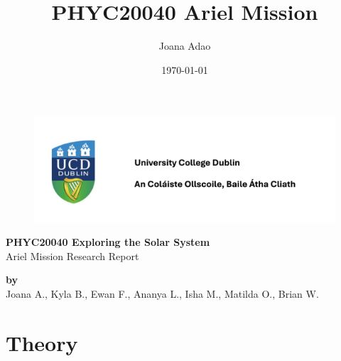 \documentclass[12pt]{report}
\title{PHYC20040 Ariel Mission}
\author{Joana Adao}
\date{\today}
\begin{document}
\begin{titlepage}
    \begin{figure}[H]
        \includegraphics[width=.8\textwidth]{UCDLogo.png}
    \end{figure}

    \begin{center}
        \vspace{5cm}

        {\LARGE \bfseries PHYC20040 Exploring the Solar System}\\
        \vspace{0.75cm}
        {\Large Ariel Mission Research Report}
        
        \vspace{1cm}
    

    \vspace{2cm}
    
    {\large \textbf{by}}\\
    \vspace{.5cm}
    {\large Joana A., Kyla B., Ewan F., Ananya L., Isha M., Matilda O., Brian W.}\\

    \end{center}
    
   \clearpage

\end{titlepage}

\tableofcontents
\thispagestyle{empty}

\newpage

\begin{abstract}
\thispagestyle{empty}



 
\end{abstract}


\setcounter{page}{1}

\chapter{Theory} \label{sec:1}

\cite{rian}



\newpage



 \label{sec:ref}

\vspace{1.5cm}

\listoffigures
\end{document}
